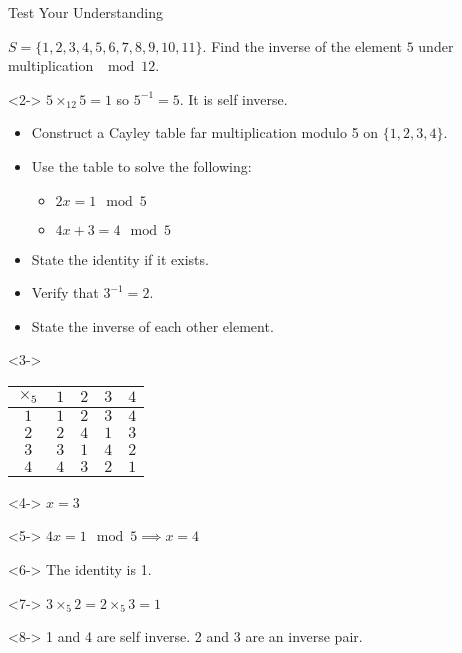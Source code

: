 \documentclass[8pt]{beamer}
\begin{document}
\begin{frame}[shrink]{Test Your Understanding}
	\begin{problem}
		$S=\{1,2,3,4,5,6,7,8,9,10,11\}$. Find the inverse of the element  $5$ under multiplication  $\mod 12$.
	\end{problem}
	\begin{solution}<2->
		$5\times_{12} 5=1 $ so $ 5^{-1}=5$. It is self inverse.
	\end{solution}
	\begin{problem}
		\begin{itemize}
			\item Construct a Cayley table far multiplication modulo 5 on $\{1,2,3,4\}.$
			\item Use the table to solve the following:
				 \begin{itemize}
					\item $2x=1 \mod 5$
					\item  $4x+3=4 \mod 5$
				\end{itemize}
			\item State the identity if it exists.
			\item Verify that $3^{-1}=2$.
			\item State the inverse of each other element.
		\end{itemize}
	
	\end{problem}
	\begin{solution}<3->
		
		\begin{center}
			\colorbox{cc!30}{
			\setlength\arrayrulewidth{0.5mm}
			\begin{tabular}{c|cccc}
				$\times_5 $ & $1$ & $2$ & $3$ & $4$ \\
				\hline
				$1$ & $1$ & $2$ & $3$ & $4$ \\
				$2$ & $2$ & $4$ & $1$ & $3$ \\
				$3$ & $3$ & $1$ & $4$ & $2$ \\
				$4$ & $4$ & $3$ & $2$ & $1$ \\
			\end{tabular}
		}
	
	\end{center}
	
\end{solution}
\begin{solution}<4->
	$x=3$
\end{solution}
\begin{solution}<5->
	$4x=1\mod 5 \implies x=4$
\end{solution}
\begin{solution}<6->
	The identity is 1.
\end{solution}
\begin{solution}<7->
	$3\times_5 2=2\times_5 3 =1$
\end{solution}
\begin{solution}<8->
	1 and 4 are self inverse. 2 and 3 are an inverse pair.
\end{solution}

	\end{frame}
\end{document}
